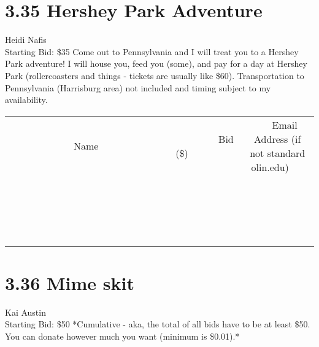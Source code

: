 \documentclass[11pt]{article}
\begin{document}
\section*{3.35 Hershey Park Adventure}
Heidi Nafis
\\
Starting Bid: \$35
\newline
Come out to Pennsylvania and I will treat you to a Hershey Park adventure! I will house you, feed you (some), and pay for a day at Hershey Park (rollercoasters and things - tickets are usually like \$60). Transportation to Pennsylvania (Harrisburg area) not included and timing subject to my availability.
\\[3ex]
\begin{tabular}{c c c}
~~~~~~~~~~~~~Name~~~~~~~~~~~~~ & ~~~~~~~~~Bid (\$)~~~~~~~~~  & ~~~Email Address (if not standard olin.edu)~~~\\
 & & \\
\hline
 & & \\
\hline
 & & \\
\hline
 & & \\
\hline
 & & \\
\hline
 & & \\
\hline
 & & \\
\hline
 & & \\
\hline
 & & \\
\hline
 & & \\
\hline
 & & \\
\hline
 & & \\
\hline
 & & \\
\hline
 & & \\
\hline
 & & \\
\hline
 & & \\
\hline
 & & \\
\hline
 & & \\
\hline
 & & \\
\hline
\end{tabular}
\newpage
\section*{3.36 Mime skit}
Kai Austin
\\
Starting Bid: \$50
\newline
*Cumulative - aka, the total of all bids have to be at least \$50. You can donate however much you want (minimum is \$0.01).*
\end{document}
